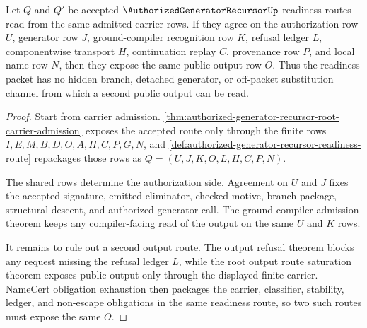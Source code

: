 \begin{theorem}
\label{thm:authorized-generator-recursor-readiness-determinacy}
Let $Q$ and $Q'$ be accepted $\AuthorizedGeneratorRecursorUp$ readiness routes read from the same admitted carrier rows. If they agree on the authorization row $U$, generator row $J$, ground-compiler recognition row $K$, refusal ledger $L$, componentwise transport $H$, continuation replay $C$, provenance row $P$, and local name row $N$, then they expose the same public output row $O$. Thus the readiness packet has no hidden branch, detached generator, or off-packet substitution channel from which a second public output can be read.
\end{theorem}
\begin{proof}
Start from carrier admission. \autoref{thm:authorized-generator-recursor-root-carrier-admission} exposes the accepted route only through the finite rows $I,E,M,B,D,O,A,H,C,P,G,N$, and \autoref{def:authorized-generator-recursor-readiness-route} repackages those rows as $Q=(U,J,K,O,L,H,C,P,N)$.

The shared rows determine the authorization side. Agreement on $U$ and $J$ fixes the accepted signature, emitted eliminator, checked motive, branch package, structural descent, and authorized generator call. The ground-compiler admission theorem keeps any compiler-facing read of the output on the same $U$ and $K$ rows.

It remains to rule out a second output route. The output refusal theorem blocks any request missing the refusal ledger $L$, while the root output route saturation theorem exposes public output only through the displayed finite carrier. NameCert obligation exhaustion then packages the carrier, classifier, stability, ledger, and non-escape obligations in the same readiness route, so two such routes must expose the same $O$.
\end{proof}

